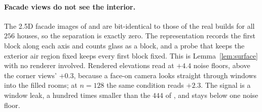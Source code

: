 \begin{table}[h]
\centering
\small
\setlength{\tabcolsep}{3.5pt}
\caption{\textbf{Facade and cross-section views ($n{=}256$).} Separation in noise floors
above held-out real data. $\rho$: Spearman correlation of the ordering of eleven arms
(four probes, three procedural baselines, three autoregressive arms, Dream-Cubed) with
corner-view \mvkid{} and with \vkid{}. The A-2.5D images of \solidify{} and \hollow{} are
bit-identical to the real images for all $256$ builds.}
\label{tab:views25d}
\end{table}

\paragraph{Facade views do not see the interior.} The 2.5D facade images of \solidify{}
and \hollow{} are bit-identical to those of the real builds for all $256$ houses, so the
separation is exactly zero. The representation records the first block along each axis
and counts glass as a block, and a probe that keeps the exterior air region fixed keeps
every first block fixed. This is Lemma~\ref{lem:surface} with no
renderer involved. Rendered elevations read \solidify{} at $+4.4$ noise floors, above the
corner views' $+0.3$, because a face-on camera looks straight through windows into the
filled rooms; at $n{=}128$ the same condition reads $+2.3$. The signal is a window
leak, a hundred times smaller than the $444$ of \vkid{}, and \hollow{} stays below one
noise floor.

